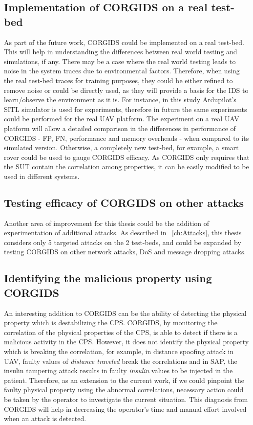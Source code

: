 \subsection{Implementation of \ac{CORGIDS} on a real test-bed}
As part of the future work, \ac{CORGIDS} could be implemented on a real test-bed. This will help in understanding the differences between real world testing and simulations, if any. There may be a case where the real world testing leads to noise in the system traces due to environmental factors. Therefore, when using the real test-bed traces for training purposes, they could be either refined to remove noise or could be directly used, as they will provide a basis for the IDS to learn/observe the environment as it is. For instance, in this study Ardupilot's \ac{SITL} simulator is used for experiments, therefore in future the same experiments could be performed for the real \ac{UAV} platform. The experiment on a real \ac{UAV} platform will allow a detailed comparison in the differences in performance of \ac{CORGIDS} - \ac{FP}, \ac{FN}, performance and memory overheads - when compared to its simulated version. Otherwise, a completely new test-bed, for example, a smart rover could be used to gauge \ac{CORGIDS} efficacy. As \ac{CORGIDS} only requires that the \ac{SUT} contain the correlation among properties, it can be easily modified to be used in different systems.

\subsection{Testing efficacy of \ac{CORGIDS} on other attacks}
Another area of improvement for this thesis could be the addition of experimentation of additional attacks. As described in ~\autoref{ch:Attacks}, this thesis considers only 5 targeted attacks on the 2 test-beds, and could be expanded by testing \ac{CORGIDS} on other network attacks, \ac{DoS} and message dropping attacks. 

\subsection{Identifying the malicious property using \ac{CORGIDS}}
An interesting addition to \ac{CORGIDS} can be the ability of detecting the physical property which is destabilizing the \ac{CPS}. \ac{CORGIDS}, by monitoring the correlation of the physical properties of the \ac{CPS}, is able to detect if there is a malicious activity in the \ac{CPS}. However, it does not identify the physical property which is breaking the correlation, for example, in distance spoofing attack in \ac{UAV}, faulty values of \textit{distance traveled} break the correlations and in \ac{SAP}, the insulin tampering attack results in faulty \textit{insulin} values to be injected in the patient. Therefore, as an extension to the current work, if we could pinpoint the faulty physical property using the abnormal correlations, necessary action could be taken by the operator to investigate the current situation. This diagnosis from \ac{CORGIDS} will help in decreasing the operator's time and manual effort involved when an attack is detected.

